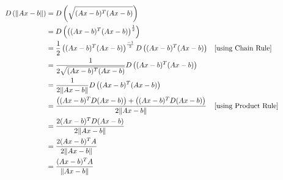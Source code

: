 \documentclass{article}
\begin{document}
    \begin{align*}
        D\left( \| Ax-b \| \right) &= D \left( \sqrt{(Ax-b)^T (Ax-b)} \right) \\
        &= D \left( \left( (Ax-b)^T (Ax-b) \right)^{\frac{1}{2}} \right) \\
        &= \frac{1}{2} \left((Ax-b)^T (Ax-b) \right)^{\frac{-1}{2}} D \left( (Ax-b)^T (Ax-b) \right) & \parbox[c]{0.4\linewidth}{[using Chain Rule]} \\
        &= \frac{1}{2 \sqrt { (Ax-b)^T (Ax-b) }} D \left( (Ax-b)^T (Ax-b) \right) \\
        &= \frac{1}{2 \| Ax-b \| } D \left( (Ax-b)^T (Ax-b) \right) \\
        &= \frac{ \left( (Ax-b)^T D(Ax-b) \right) + \left( (Ax-b)^T D(Ax-b) \right) }{2 \| Ax-b \| } & \parbox[c]{0.4\linewidth}{[using Product Rule]} \\
        &= \frac{ 2(Ax-b)^T D(Ax-b) }{2 \| Ax-b \| } \\
        &= \frac{ 2(Ax-b)^T A }{2 \| Ax-b \| } \\
        &= \frac{ (Ax-b)^T A }{\| Ax-b \| }
    \end{align*}
\end{document}
